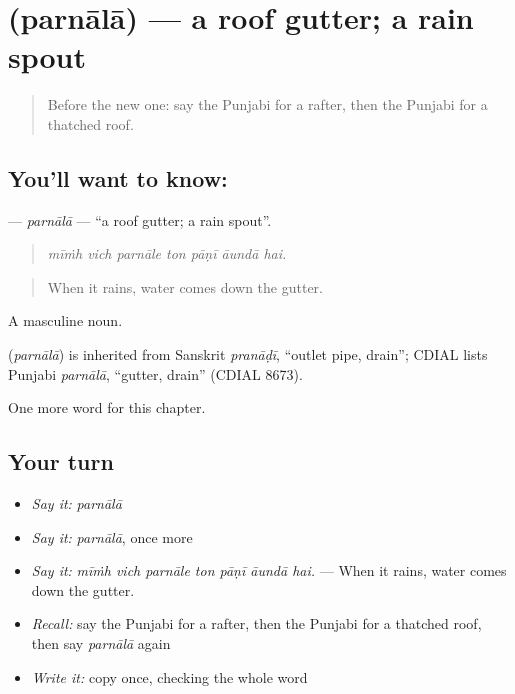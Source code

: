 \section[\texorpdfstring{\pa{ਪਰਨਾਲਾ} (parnālā)}{ਪਰਨਾਲਾ (parnālā)}]{ (parnālā) — a roof gutter; a rain spout}

\label{lesson:PA-C246-parnala}



\begin{quote}
Before the new one: say the Punjabi for a rafter, then the Punjabi for a thatched roof.
\end{quote}

\subsection*{You'll want to know: }
\textbf{} — \emph{parnālā} — \textquotedblleft{}a roof gutter; a rain spout\textquotedblright{}.

\begin{quote}
      
\end{quote}

\begin{quote}
\emph{mīṁh vich parnāle ton pāṇī āundā hai.}
\end{quote}

\begin{quote}
When it rains, water comes down the gutter.
\end{quote}

A masculine noun.

\begin{cousinweb}
\textbf{} (\emph{parnālā}) is inherited from Sanskrit \emph{pranāḍī}, \textquotedblleft{}outlet pipe, drain\textquotedblright{}; CDIAL lists Punjabi \emph{parnālā}, \textquotedblleft{}gutter, drain\textquotedblright{} (CDIAL 8673).
\end{cousinweb}

\begin{grammarlens}[title={What you've built}]
One more word for this chapter.
\end{grammarlens}

\subsection*{Your turn}
\begin{itemize}
\raggedright
  \item \emph{Say it:} \emph{parnālā}
  \item \emph{Say it:} \emph{parnālā}, once more
  \item \emph{Say it:} \emph{mīṁh vich parnāle ton pāṇī āundā hai.} — When it rains, water comes down the gutter.
  \item \emph{Recall:} say the Punjabi for a rafter, then the Punjabi for a thatched roof, then say \emph{parnālā} again
  \item \emph{Write it:} copy \textbf{} once, checking the whole word
\end{itemize}

